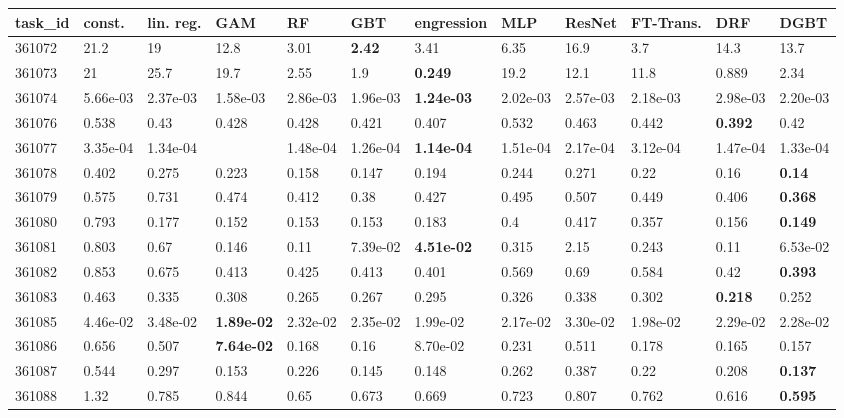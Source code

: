 \begin{table}[ht!]
\centering
\begingroup\footnotesize
\begin{tabular}{llllllllllll}
  \hline
\hline
task\_id & const. & lin. reg. & GAM & RF & GBT & engression & MLP & ResNet & FT-Trans. & DRF & DGBT \\ 
  \hline
361072 & 21.2 & 19 & 12.8 & 3.01 & \textbf{2.42} & 3.41 & 6.35 & 16.9 & 3.7 & 14.3 & 13.7 \\ 
  361073 & 21 & 25.7 & 19.7 & 2.55 & 1.9 & \textbf{0.249} & 19.2 & 12.1 & 11.8 & 0.889 & 2.34 \\ 
  361074 & 5.66e-03 & 2.37e-03 & 1.58e-03 & 2.86e-03 & 1.96e-03 & \textbf{1.24e-03} & 2.02e-03 & 2.57e-03 & 2.18e-03 & 2.98e-03 & 2.20e-03 \\ 
  361076 & 0.538 & 0.43 & 0.428 & 0.428 & 0.421 & 0.407 & 0.532 & 0.463 & 0.442 & \textbf{0.392} & 0.42 \\ 
  361077 & 3.35e-04 & 1.34e-04 &  & 1.48e-04 & 1.26e-04 & \textbf{1.14e-04} & 1.51e-04 & 2.17e-04 & 3.12e-04 & 1.47e-04 & 1.33e-04 \\ 
  361078 & 0.402 & 0.275 & 0.223 & 0.158 & 0.147 & 0.194 & 0.244 & 0.271 & 0.22 & 0.16 & \textbf{0.14} \\ 
  361079 & 0.575 & 0.731 & 0.474 & 0.412 & 0.38 & 0.427 & 0.495 & 0.507 & 0.449 & 0.406 & \textbf{0.368} \\ 
  361080 & 0.793 & 0.177 & 0.152 & 0.153 & 0.153 & 0.183 & 0.4 & 0.417 & 0.357 & 0.156 & \textbf{0.149} \\ 
  361081 & 0.803 & 0.67 & 0.146 & 0.11 & 7.39e-02 & \textbf{4.51e-02} & 0.315 & 2.15 & 0.243 & 0.11 & 6.53e-02 \\ 
  361082 & 0.853 & 0.675 & 0.413 & 0.425 & 0.413 & 0.401 & 0.569 & 0.69 & 0.584 & 0.42 & \textbf{0.393} \\ 
  361083 & 0.463 & 0.335 & 0.308 & 0.265 & 0.267 & 0.295 & 0.326 & 0.338 & 0.302 & \textbf{0.218} & 0.252 \\ 
  361085 & 4.46e-02 & 3.48e-02 & \textbf{1.89e-02} & 2.32e-02 & 2.35e-02 & 1.99e-02 & 2.17e-02 & 3.30e-02 & 1.98e-02 & 2.29e-02 & 2.28e-02 \\ 
  361086 & 0.656 & 0.507 & \textbf{7.64e-02} & 0.168 & 0.16 & 8.70e-02 & 0.231 & 0.511 & 0.178 & 0.165 & 0.157 \\ 
  361087 & 0.544 & 0.297 & 0.153 & 0.226 & 0.145 & 0.148 & 0.262 & 0.387 & 0.22 & 0.208 & \textbf{0.137} \\ 
  361088 & 1.32 & 0.785 & 0.844 & 0.65 & 0.673 & 0.669 & 0.723 & 0.807 & 0.762 & 0.616 & \textbf{0.595} \\ 

\end{tabular}
\end{table}
